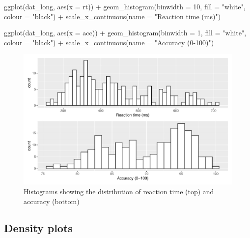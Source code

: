 \documentclass[
  english,
  doc,floatsintext]{apa6}
\newenvironment{Shaded}{\begin{snugshade}}{\end{snugshade}}
\newcommand{\AttributeTok}[1]{\textcolor[rgb]{0.77,0.63,0.00}{#1}}
\newcommand{\DecValTok}[1]{\textcolor[rgb]{0.00,0.00,0.81}{#1}}
\newcommand{\FunctionTok}[1]{\textcolor[rgb]{0.00,0.00,0.00}{#1}}
\newcommand{\NormalTok}[1]{#1}
\newcommand{\SpecialCharTok}[1]{\textcolor[rgb]{0.00,0.00,0.00}{#1}}
\newcommand{\StringTok}[1]{\textcolor[rgb]{0.31,0.60,0.02}{#1}}
\begin{document}
\begin{Shaded}
\begin{Highlighting}[]
\FunctionTok{ggplot}\NormalTok{(dat\_long, }\FunctionTok{aes}\NormalTok{(}\AttributeTok{x =}\NormalTok{ rt)) }\SpecialCharTok{+}
  \FunctionTok{geom\_histogram}\NormalTok{(}\AttributeTok{binwidth =} \DecValTok{10}\NormalTok{, }\AttributeTok{fill =} \StringTok{"white"}\NormalTok{, }\AttributeTok{colour =} \StringTok{"black"}\NormalTok{) }\SpecialCharTok{+}
  \FunctionTok{scale\_x\_continuous}\NormalTok{(}\AttributeTok{name =} \StringTok{"Reaction time (ms)"}\NormalTok{)}

\FunctionTok{ggplot}\NormalTok{(dat\_long, }\FunctionTok{aes}\NormalTok{(}\AttributeTok{x =}\NormalTok{ acc)) }\SpecialCharTok{+}
  \FunctionTok{geom\_histogram}\NormalTok{(}\AttributeTok{binwidth =} \DecValTok{1}\NormalTok{, }\AttributeTok{fill =} \StringTok{"white"}\NormalTok{, }\AttributeTok{colour =} \StringTok{"black"}\NormalTok{) }\SpecialCharTok{+}
  \FunctionTok{scale\_x\_continuous}\NormalTok{(}\AttributeTok{name =} \StringTok{"Accuracy (0{-}100)"}\NormalTok{)}
\end{Highlighting}
\end{Shaded}

\begin{figure}

{\centering \includegraphics[width=1\linewidth]{images/histograms-1} 

}

\caption{Histograms showing the distribution of reaction time (top) and accuracy (bottom)}\label{fig:histograms}
\end{figure}

\hypertarget{density-plots}{%
\subsection{Density plots}\label{density-plots}}
\end{document}
